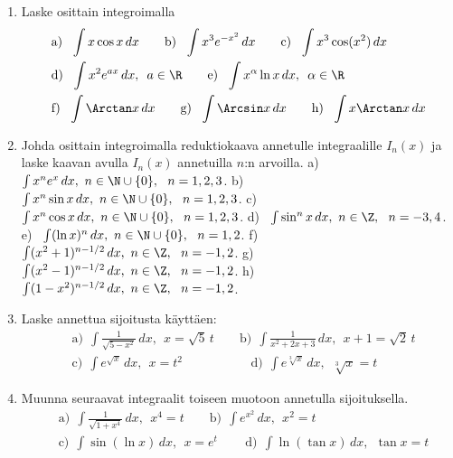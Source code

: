 \Harj
\begin{enumerate}

\item
Laske osittain integroimalla
\begin{align*}
&\text{a)}\ \ \int x\cos x\,dx \qquad
 \text{b)}\ \ \int x^3 e^{-x^2}\,dx \qquad
 \text{c)}\ \ \int x^3\cos(x^2)\,dx \\
&\text{d)}\ \ \int x^2 e^{ax}\,dx,\,\ a\in\R \qquad
 \text{e)}\ \ \int x^\alpha\ln x\,dx,\,\ \alpha\in\R \\
&\text{f)}\ \ \int \Arctan x\,dx \qquad
 \text{g)}\ \ \int \Arcsin x\,dx \qquad
 \text{h)}\ \ \int x\Arctan x\,dx
\end{align*}

\item
Johda osittain integroimalla reduktiokaava annetulle integraalille $I_n(x)$ ja laske kaavan
avulla $I_n(x)$ annetuilla $n$:n arvoilla. \vspace{1mm}\newline
a) \ $\int x^n e^x\,dx,\ n\in\N\cup\{0\},\ \ n=1,2,3$. \newline
b) \ $\int x^n \sin x\,dx,\ n\in\N\cup\{0\},\ \ n=1,2,3$. \newline
c) \ $\int x^n \cos x\,dx,\ n\in\N\cup\{0\},\ \ n=1,2,3$. \newline
d) \ $\int \sin^n x\,dx,\ n\in\Z,\ \ n=-3,4$. \newline
e) \ $\int (\ln x)^n\,dx,\ n\in\N\cup\{0\},\ \ n=1,2$. \newline
f) \ $\int (x^2+1)^{n-1/2}\,dx,\ n\in\Z,\ \ n=-1,2$. \newline
g) \ $\int (x^2-1)^{n-1/2}\,dx,\ n\in\Z,\ \ n=-1,2$. \newline
h) \ $\int (1-x^2)^{n-1/2}\,dx,\ n\in\Z,\ \ n=-1,2$.

\item
Laske annettua sijoitusta käyttäen:
\begin{align*}
&\text{a)}\ \ \int \frac{1}{\sqrt{5-x^2}}\,dx,\ \ x=\sqrt{5}\,t \qquad
 \text{b)}\ \ \int \frac{1}{x^2+2x+3}\,dx,\ \ x+1=\sqrt{2}\,t \\
&\text{c)}\ \ \int e^{\sqrt{x}}\,dx,\ \ x=t^2 \qquad\qquad\quad\,\
 \text{d)}\ \ \int e^{\sqrt[3]{x}}\,dx,\ \ \sqrt[3]{x}=t
\end{align*}

\item
Muunna seuraavat integraalit toiseen muotoon annetulla sijoituksella.
\begin{align*}
&\text{a)}\ \ \int \frac{1}{\sqrt{1+x^4}}\,dx,\ \ x^4=t \qquad
 \text{b)}\ \ \int e^{x^2}\,dx,\ \ x^2=t \\
&\text{c)}\ \ \int \sin(\ln x)\,dx,\ \ x=e^t \qquad\,
 \text{d)}\ \ \int \ln(\tan x)\,dx,\ \ \tan x=t
\end{align*}


\end{enumerate}
